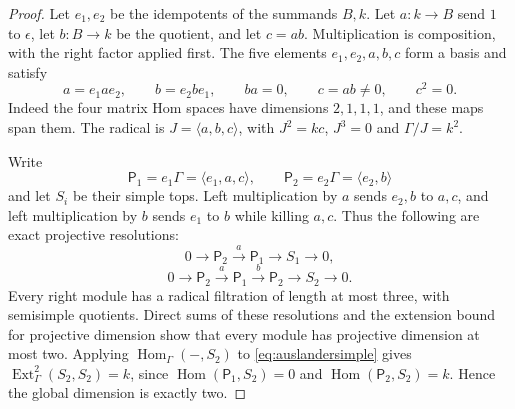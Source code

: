 \begin{proof}
Let $e_1,e_2$ be the idempotents of the summands $B,k$.
Let $a:k\to B$ send $1$ to $\epsilon$, let $b:B\to k$ be
the quotient, and let $c=ab$. Multiplication is composition,
with the right factor applied first. The five elements
$e_1,e_2,a,b,c$ form a basis and satisfy
\[
 a=e_1ae_2,\qquad b=e_2be_1,\qquad ba=0,\qquad
 c=ab\ne0,\qquad c^2=0.
\]
Indeed the four matrix Hom spaces have dimensions $2,1,1,1$,
and these maps span them. The radical is
$J=\langle a,b,c\rangle$, with $J^2=kc$, $J^3=0$ and
$\Gamma/J=k^2$.

Write
\[
 \mathsf P_1=e_1\Gamma=\langle e_1,a,c\rangle,\qquad
 \mathsf P_2=e_2\Gamma=\langle e_2,b\rangle
\]
and let $S_i$ be their simple tops.
Left multiplication by $a$ sends $e_2,b$ to $a,c$, and left
multiplication by $b$ sends $e_1$ to $b$ while killing $a,c$.
Thus the following are exact projective resolutions:
\[
 0\longrightarrow\mathsf P_2\xrightarrow{a}\mathsf P_1
   \longrightarrow S_1\longrightarrow0,
\]
\begin{equation}\label{eq:auslandersimple}
 0\longrightarrow\mathsf P_2\xrightarrow{a}\mathsf P_1
   \xrightarrow{b}\mathsf P_2\longrightarrow S_2
   \longrightarrow0.
\end{equation}
Every right module has a radical filtration of length at most
three, with semisimple quotients. Direct sums of these resolutions
and the extension bound for projective dimension show that every
module has projective dimension at most two. Applying
$\operatorname{Hom}_\Gamma(-,S_2)$ to
\eqref{eq:auslandersimple} gives
$\operatorname{Ext}^2_\Gamma(S_2,S_2)=k$, since
$\operatorname{Hom}(\mathsf P_1,S_2)=0$ and
$\operatorname{Hom}(\mathsf P_2,S_2)=k$. Hence the global
dimension is exactly two.


\end{proof}
